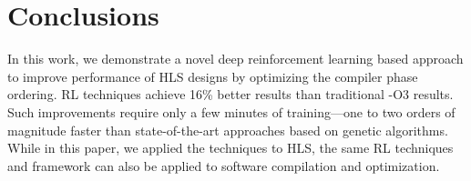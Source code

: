 \section{Conclusions} %
\label{sec:conc}
\vspace{-0.1cm}

In this work, we demonstrate a novel deep reinforcement learning based approach to improve performance of HLS designs by optimizing the compiler phase ordering. 
RL techniques achieve 16\% better results than traditional -O3 results. 
Such improvements require only a few minutes of training---one to two orders of magnitude faster than state-of-the-art approaches based on genetic algorithms.
While in this paper, we applied the techniques to HLS, the same RL techniques and framework can also be applied to software compilation and optimization.  

